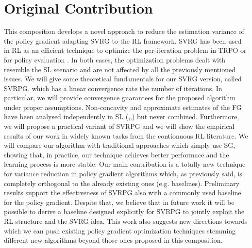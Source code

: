 \section{Original Contribution}
This composition develops a novel approach to reduce the estimation variance of the policy gradient adapting \acs{SVRG} to the \acs{RL} framework.\newline 
\acs{SVRG} has been used in \acs{RL} as an efficient technique to optimize the per-iteration problem in \ac{TRPO} \citep{xu2017stochastic} or for policy evaluation \citep{du2017stochastic}. In both cases, the optimization problems dealt with resemble the \acs{SL} scenario and are not affected by all the previously mentioned issues.
We will give some theoretical fundamentals for our \acs{SVRG} version, called \acf{SVRPG}, which has a linear convergence rate \wrt the number of iterations. In particular, we will provide convergence guarantees for the proposed algorithm under proper assumptions. Non-concavity and approximate estimates of the \acf{FG} have been analysed independently in \acs{SL} (\cite{allen2016variance},\cite{reddi2016stochastic},\cite{harikandeh2015stopwasting}) but never combined.\newline
 Furthermore, we will propose a practical variant of \acs{SVRPG} and we will show the empirical results of our work in widely known tasks from the contionuous \acs{RL} literature. We will compare our algorithm with traditional approaches which simply use \acs{SG}, showing that, in practice, our technique achieves better performace and the learning process is more stable.\newline
Our main contribution is a totally new technique for variance reduction in policy gradient algorithms which, as previously said, is completely orthogonal to the already existing ones (e.g. baselines).
Preliminary results support the effectiveness of \acs{SVRPG} also with a commonly used baseline for the policy gradient. Despite that, we believe that in future work it will be possible to derive a baseline designed explicitly for \acs{SVRPG} to jointly exploit the \acs{RL} structure and the \acs{SVRG} idea.\newline
This work also suggests new directions towards which we can push existing policy gradient optimization techniques stemming different new algorithms beyond those ones proposed in this composition.\newline
